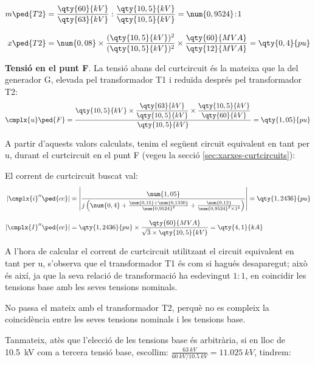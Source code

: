 \begin{exemple}[\MetodeCalculPU{}]
    \begin{align*}
    m\ped{T2} &= \frac{\qty{60}{kV}}{\qty{63}{kV}} :
    \frac{\qty{10,5}{kV}}{\qty{10,5}{kV}} = \num{0,9524}\!:\!1 \\[3mm]
    x\ped{T2} &= \num{0,08} \times \frac{(\qty{10,5}{kV})^2}{(\qty{10,5}{kV})^2} \times
    \frac{\qty{60}{MVA}}{\qty{12}{MVA}}  = \qty{0,4}{pu}
    \end{align*}

    \textbf{Tensió en el punt F}. La tensió abans del curtcircuit és la mateixa que la del generador G, elevada pel transformador T1 i reduïda després pel transformador T2:
    \[
    \cmplx{u}\ped{F} = \frac{\qty{10,5}{kV} \times
    \dfrac{\qty{63}{kV}}{\qty{10,5}{kV}} \times
    \dfrac{\qty{10,5}{kV}}{\qty{60}{kV}}}{\qty{10,5}{kV}} = \qty{1,05}{pu}
    \]

    A partir d'aquests valors calculats, tenim el següent circuit equivalent en tant per u, durant el
    curtcircuit en el punt F (vegeu la secció \ref{sec:xarxes-curtcircuits}):

    \begin{center}
       
    \end{center}

    El corrent de curtcircuit buscat val:
    \begin{align*}
    |\cmplx{i}''\ped{cc}| &= \left| \frac{\num{1,05}}{j \left( \num{0,4} + \frac{\num{0,15} + \num{0,1330}}{\num{0,9524}^2} + \frac{\num{0,12}}{\num{0,9524}^2 \times 1^2} \right)} \right| =
     \qty{1,2436}{pu} \\[3mm]
     |\cmplx{I}''\ped{cc}| &= \qty{1,2436}{pu}\times\frac{\qty{60}{MVA}}{\sqrt{3}\times \qty{10,5}{kV}} =
     \qty{4,1}{kA}
    \end{align*}

     A l'hora de calcular el corrent de curtcircuit utilitzant el circuit equivalent en tant per u,
     s'observa que el transformador T1 és com si hagués desaparegut;
     això és així, ja que la seva relació de transformació ha esdevingut
     $1\!:\!1$, en coincidir les tensions base amb les seves tensions nominals.

     No passa el mateix amb el transformador T2, perquè no es compleix
     la coincidència entre les seves tensions nominals i les tensions
     base.

     Tanmateix, atès que l'elecció de les tensions base és
     arbitrària, si en lloc de \qty{10,5}{kV} com a tercera tensió base,
     escollim:
     $\frac{\qty{63}{kV}}{\qty{60}{kV} / \qty{10,5}{kV}}=\qty{11,025}{kV}$,
     tindrem:


\end{exemple}
